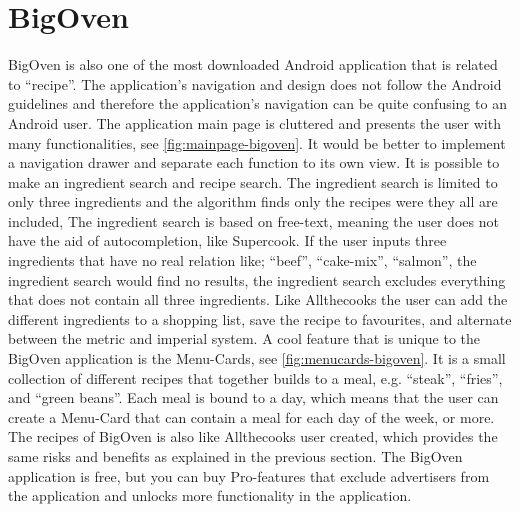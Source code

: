 \section{BigOven}
BigOven is also one of the most downloaded \cite{bigoven-googleplay} Android application that is related to ``recipe''. The application's navigation and design does not follow the Android guidelines\cite{guidelines-appstructure} and therefore the application's navigation can be quite confusing to an Android user.
The application main page is cluttered and presents the user with many functionalities, see \autoref{fig:mainpage-bigoven}. It would be better to implement a navigation drawer and separate each function to its own view. 
It is possible to make an ingredient search and recipe search. The ingredient search is limited to only three ingredients and the algorithm finds only the recipes were they all are included, The ingredient search is based on free-text, meaning the user does not have the aid of autocompletion, like Supercook. If the user inputs three ingredients that have no real relation like; ``beef'', ``cake-mix'', ``salmon'', the ingredient search would find no results, the ingredient search excludes everything that does not contain all three ingredients.
Like Allthecooks the user can add the different ingredients to a shopping list, save the recipe to favourites, and alternate between the metric and imperial system.
A cool feature that is unique to the BigOven application is the Menu-Cards, see \autoref{fig:menucards-bigoven}.
It is a small collection of different recipes that together builds to a meal, e.g. ``steak'', ``fries'', and ``green beans''. Each meal is bound to a day, which means that the user can create a Menu-Card that can contain a meal for each day of the week, or more.
The recipes of BigOven is also like Allthecooks user created, which provides the same risks and benefits as explained in the previous section.
The BigOven application is free, but you can buy Pro-features that exclude advertisers from the application and unlocks more functionality in the application.

